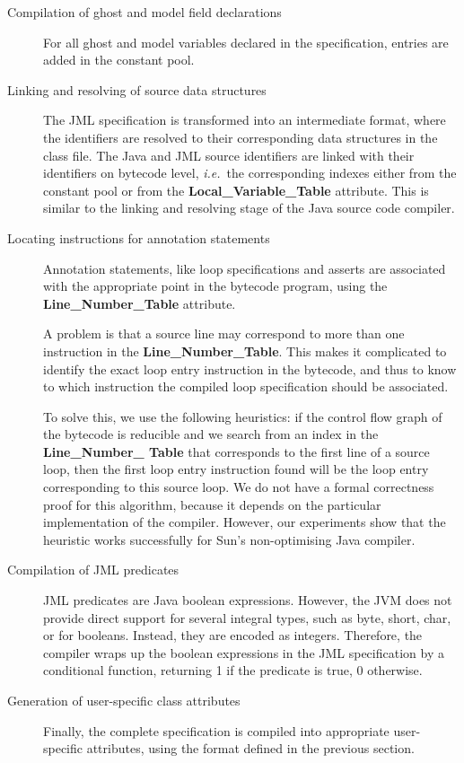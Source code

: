 \begin{description}

\item[Compilation of ghost and model field declarations] 
For all ghost and model variables declared in the specification,
entries are added in the constant pool. 


\item[Linking and resolving of source data structures]
The JML specification is transformed into an intermediate format,
where the identifiers are resolved to their corresponding data
structures in the class file.  The Java and JML source identifiers are
linked with their identifiers on bytecode level, \emph{i.e.}\ the
corresponding indexes either from the constant pool or from the
\textbf{Local\_Variable\_Table} attribute. This is similar to the
linking and resolving stage of the Java source code compiler.

\item[Locating instructions for annotation statements] 
Annotation statements, like loop specifications and asserts are
associated with the appropriate point in the bytecode program, using
the \textbf{Line\_Number\_Table} attribute.

A problem is that a source line may correspond to more than
one instruction in the \textbf{Line\_Number\_Table}. This makes it
complicated to identify the exact loop entry instruction in the
bytecode, and thus to know to which instruction the compiled loop
specification should be associated. 
 
To solve this, we use the following heuristics: if the control
flow graph of the bytecode is reducible and we search from an index
in the \textbf{Line\_Number\_ Table} that corresponds to the first line
of a source loop, then the first loop entry instruction found will be
the loop entry corresponding to this source loop.  We do not have a
formal correctness proof for this algorithm, because it depends on the
particular implementation of the compiler.  However, our experiments
show that the heuristic works successfully for Sun's non-optimising
Java compiler.
 
\item[Compilation of JML predicates]
JML predicates are Java boolean expressions. However, the JVM does not
provide direct support for several integral types, such as byte,
short, char, or for booleans. Instead, they are encoded as integers.
Therefore, the compiler wraps up the boolean expressions in the JML
specification by a conditional function, returning 1 if the predicate
is true, 0 otherwise.

\item[Generation of user-specific class attributes]
Finally, the complete specification is compiled into appropriate
user-specific attributes, using the format defined in the previous
section. 
    
\end{description}

